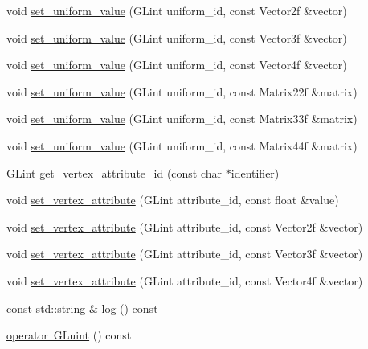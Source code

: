 \begin{DoxyCompactItemize}
\item 
void \mbox{\hyperlink{classoglsl_1_1_shader___program_a86e83ef3d42661b55e7a14a08b1a568d}{set\+\_\+uniform\+\_\+value}} (G\+Lint uniform\+\_\+id, const Vector2f \&vector)
\item 
void \mbox{\hyperlink{classoglsl_1_1_shader___program_a9dd08db780ff6e96b31ea29609eb8a80}{set\+\_\+uniform\+\_\+value}} (G\+Lint uniform\+\_\+id, const Vector3f \&vector)
\item 
void \mbox{\hyperlink{classoglsl_1_1_shader___program_a557120833ebf82dd66f4b3ce120649b3}{set\+\_\+uniform\+\_\+value}} (G\+Lint uniform\+\_\+id, const Vector4f \&vector)
\item 
void \mbox{\hyperlink{classoglsl_1_1_shader___program_a664e80fef5a7c5941c79aff725fee938}{set\+\_\+uniform\+\_\+value}} (G\+Lint uniform\+\_\+id, const Matrix22f \&matrix)
\item 
void \mbox{\hyperlink{classoglsl_1_1_shader___program_a1504c5005186747a2311cf54ca1c1578}{set\+\_\+uniform\+\_\+value}} (G\+Lint uniform\+\_\+id, const Matrix33f \&matrix)
\item 
void \mbox{\hyperlink{classoglsl_1_1_shader___program_ad51c8c4a1556fa64b48f631d9cfd51c4}{set\+\_\+uniform\+\_\+value}} (G\+Lint uniform\+\_\+id, const Matrix44f \&matrix)
\item 
G\+Lint \mbox{\hyperlink{classoglsl_1_1_shader___program_a65d4cfa8e94ce9233bd65834b62df9e3}{get\+\_\+vertex\+\_\+attribute\+\_\+id}} (const char $\ast$identifier)
\item 
void \mbox{\hyperlink{classoglsl_1_1_shader___program_a31fd105d64825c2e7091ec536e7d15b3}{set\+\_\+vertex\+\_\+attribute}} (G\+Lint attribute\+\_\+id, const float \&value)
\item 
void \mbox{\hyperlink{classoglsl_1_1_shader___program_ab36f450b1a5d2ee375fb64ace2b89ccf}{set\+\_\+vertex\+\_\+attribute}} (G\+Lint attribute\+\_\+id, const Vector2f \&vector)
\item 
void \mbox{\hyperlink{classoglsl_1_1_shader___program_a95661ac1e32f6d3ffc1bfc81ce443e4a}{set\+\_\+vertex\+\_\+attribute}} (G\+Lint attribute\+\_\+id, const Vector3f \&vector)
\item 
void \mbox{\hyperlink{classoglsl_1_1_shader___program_a8e9053c1e6f9217ad9f12e245a0808a7}{set\+\_\+vertex\+\_\+attribute}} (G\+Lint attribute\+\_\+id, const Vector4f \&vector)
\item 
const std\+::string \& \mbox{\hyperlink{classoglsl_1_1_shader___program_addd674132d0eedf58f6bc92f0e446dc5}{log}} () const
\item 
\mbox{\hyperlink{classoglsl_1_1_shader___program_adad81ab380ceef8c885f084dfd6287c7}{operator G\+Luint}} () const
\end{DoxyCompactItemize}
